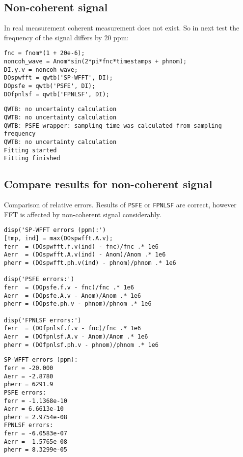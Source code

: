 {}
\subsection*{Non-coherent signal}



In real measurement coherent measurement does not exist. So in next test the
frequency of the signal differs by 20 ppm:

\begin{lstlisting}
fnc = fnom*(1 + 20e-6);
noncoh_wave = Anom*sin(2*pi*fnc*timestamps + phnom);
DI.y.v = noncoh_wave;
DOspwfft = qwtb('SP-WFFT', DI);
DOpsfe = qwtb('PSFE', DI);
DOfpnlsf = qwtb('FPNLSF', DI);
\end{lstlisting}
\begin{lstlisting}[language={},xleftmargin=5pt,frame=none]
QWTB: no uncertainty calculation
QWTB: no uncertainty calculation
QWTB: PSFE wrapper: sampling time was calculated from sampling frequency
QWTB: no uncertainty calculation
Fitting started
Fitting finished

\end{lstlisting}


{}
\subsection*{Compare results for non-coherent signal}



Comparison of relative errors. Results of \texttt{PSFE} or \texttt{FPNLSF} are correct, however
FFT is affected by non-coherent signal considerably.

\begin{lstlisting}
disp('SP-WFFT errors (ppm):')
[tmp, ind] = max(DOspwfft.A.v);
ferr  = (DOspwfft.f.v(ind) - fnc)/fnc .* 1e6
Aerr  = (DOspwfft.A.v(ind) - Anom)/Anom .* 1e6
pherr = (DOspwfft.ph.v(ind) - phnom)/phnom .* 1e6

disp('PSFE errors:')
ferr  = (DOpsfe.f.v - fnc)/fnc .* 1e6
Aerr  = (DOpsfe.A.v - Anom)/Anom .* 1e6
pherr = (DOpsfe.ph.v - phnom)/phnom .* 1e6

disp('FPNLSF errors:')
ferr  = (DOfpnlsf.f.v - fnc)/fnc .* 1e6
Aerr  = (DOfpnlsf.A.v - Anom)/Anom .* 1e6
pherr = (DOfpnlsf.ph.v - phnom)/phnom .* 1e6
\end{lstlisting}
\begin{lstlisting}[language={},xleftmargin=5pt,frame=none]
SP-WFFT errors (ppm):
ferr = -20.000
Aerr = -2.8780
pherr = 6291.9
PSFE errors:
ferr = -1.1368e-10
Aerr = 6.6613e-10
pherr = 2.9754e-08
FPNLSF errors:
ferr = -6.0583e-07
Aerr = -1.5765e-08
pherr = 8.3299e-05

\end{lstlisting}


